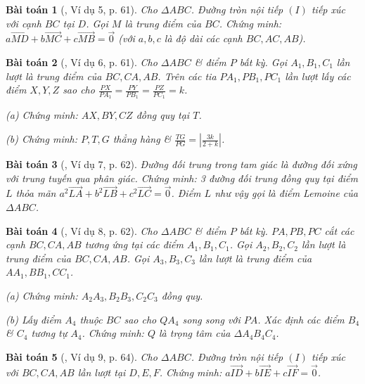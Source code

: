 \documentclass{article}
\numberwithin{equation}{section}
\newtheorem{baitoan}{Bài toán}[section]
\begin{document}
\begin{baitoan}[\cite{Hai_Hung_Thu_Tung2022_tap_1}, Ví dụ 5, p. 61]
	Cho $\Delta ABC$. Đường tròn nội tiếp $(I)$ tiếp xúc với cạnh $BC$ tại $D$. Gọi $M$ là trung điểm của $BC$. Chứng minh: $a\overrightarrow{MD} + b\overrightarrow{MC} + c\overrightarrow{MB} = \vec{0}$ (với $a,b,c$ là độ dài các cạnh $BC,AC,AB$).
\end{baitoan}

\begin{baitoan}[\cite{Hai_Hung_Thu_Tung2022_tap_1}, Ví dụ 6, p. 61]
	Cho $\Delta ABC$ \& điểm $P$ bất kỳ. Gọi $A_1,B_1,C_1$ lần lượt là trung điểm của $BC,CA,AB$. Trên các tia $PA_1,PB_1,PC_1$ lần lượt lấy các điểm $X,Y,Z$ sao cho $\frac{PX}{PA_1} = \frac{PY}{PB_1} = \frac{PZ}{PC_1} = k$.
	\begin{enumerate*}
		\item[(a)] Chứng minh: $AX,BY,CZ$ đồng quy tại $T$.
		\item[(b)] Chứng minh: $P,T,G$ thẳng hàng \& $\frac{TG}{PG} = \left|\frac{3k}{2 + k}\right|$.
	\end{enumerate*}
\end{baitoan}

\begin{baitoan}[\cite{Hai_Hung_Thu_Tung2022_tap_1}, Ví dụ 7, p. 62]
	Đường đối trung trong tam giác là đường đối xứng với trung tuyến qua phân giác. Chứng minh: 3 đường đối trung đồng quy tại điểm $L$ thỏa mãn $a^2\overrightarrow{LA} + b^2\overrightarrow{LB} + c^2\overrightarrow{LC} = \vec{0}$. Điểm $L$ như vậy gọi là \emph{điểm Lemoine} của $\Delta ABC$.
\end{baitoan}

\begin{baitoan}[\cite{Hai_Hung_Thu_Tung2022_tap_1}, Ví dụ 8, p. 62]
	Cho $\Delta ABC$ \& điểm $P$ bất kỳ. $PA,PB,PC$ cắt các cạnh $BC,CA,AB$ tương ứng tại các điểm $A_1,B_1,C_1$. Gọi $A_2,B_2,C_2$ lần lượt là trung điểm của $BC,CA,AB$. Gọi $A_3,B_3,C_3$ lần lượt là trung điểm của $AA_1,BB_1,CC_1$.
	\begin{enumerate*}
		\item[(a)] Chứng minh: $A_2A_3,B_2B_3,C_2C_3$ đồng quy.
		\item[(b)] Lấy điểm $A_4$ thuộc $BC$ sao cho $QA_4$ song song với $PA$. Xác định các điểm $B_4$ \& $C_4$ tương tự $A_4$. Chứng minh: $Q$ là trọng tâm của $\Delta A_4B_4C_4$.
	\end{enumerate*}
\end{baitoan}

\begin{baitoan}[\cite{Hai_Hung_Thu_Tung2022_tap_1}, Ví dụ 9, p. 64]
	Cho $\Delta ABC$. Đường tròn nội tiếp $(I)$ tiếp xúc với $BC,CA,AB$ lần lượt tại $D,E,F$. Chứng minh: $a\overrightarrow{ID} + b\overrightarrow{IE} + c\overrightarrow{IF} = \vec{0}$.
\end{baitoan}
\end{document}
